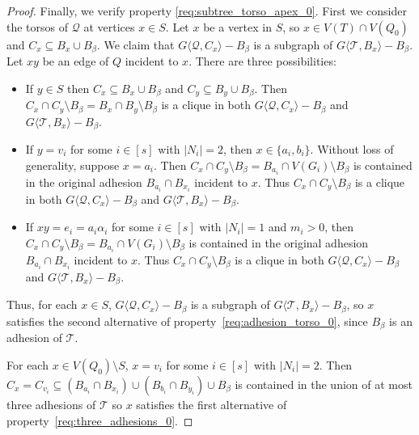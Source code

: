 \documentclass{patmorin}
\newcommand{\torso}[2]{{#1}\langle{#2}\rangle}
\newcommand{\calQ}{\mathcal{Q}}
\newcommand{\calT}{\mathcal{T}}
\begin{document}
\begin{proof}
  Finally, we verify property \ref{req:subtree_torso_apex_0}.  First we consider the torsos of $\calQ$ at vertices $x\in S$.  Let $x$ be a vertex in $S$, so $x\in V(T)\cap V(Q_0)$ and $C_x\subseteq B_x\cup B_\beta$.  We claim that $\torso{G}{\calQ,C_x}-B_\beta$ is a subgraph of $\torso{G}{\calT,B_x}-B_\beta$.  Let $xy$ be an edge of $Q$ incident to $x$. There are three possibilities:
  \begin{itemize}[nosep,nolistsep]
    \item If $y\in S$ then $C_x\subseteq B_x\cup B_\beta$ and $C_y\subseteq B_y\cup B_\beta$.  Then $C_x\cap C_y\setminus B_\beta=B_x\cap B_y\setminus B_\beta$ is a clique in both $\torso{G}{\calQ,C_x}-B_\beta$ and $\torso{G}{\calT,B_x}-B_\beta$.
    \item If $y=v_i$ for some $i\in[s]$ with $|N_i|=2$, then $x\in\{a_i,b_i\}$. Without loss of generality, suppose $x=a_i$.  Then $C_x\cap C_y\setminus B_\beta=B_{a_i}\cap V(G_i)\setminus B_\beta$ is contained in the original adhesion $B_{a_i}\cap B_{x_i}$ incident to $x$.  Thus $C_x\cap C_y\setminus B_\beta$ is a clique in both $\torso{G}{\calQ,C_x}-B_\beta$ and $\torso{G}{\calT,B_x}-B_\beta$.
    \item If $xy=e_i=a_i\alpha_i$ for some $i\in[s]$ with $|N_i|=1$ and $m_i>0$, then $C_x\cap C_y\setminus B_\beta = B_{a_i}\cap V(G_i)\setminus B_\beta$ is contained in the original adhesion $B_{a_i}\cap B_{x_i}$ incident to $x$.  Thus $C_x\cap C_y\setminus B_\beta$ is a clique in both $\torso{G}{\calQ,C_x}-B_\beta$ and $\torso{G}{\calT,B_x}-B_\beta$.
  \end{itemize}
  Thus, for each $x\in S$, $\torso{G}{\calQ,C_x}-B_\beta$ is a subgraph of $\torso{G}{\calT,B_x}-B_\beta$, so $x$ satisfies the second alternative of property~\ref{req:adhesion_torso_0}, since $B_\beta$ is an adhesion of $\calT$.

  For each $x\in V(Q_0)\setminus S$, $x=v_i$ for some $i\in[s]$ with $|N_i|=2$.  Then $C_x=C_{v_i}\subseteq (B_{a_i}\cap B_{x_i})\cup (B_{b_i}\cap B_{y_i})\cup B_\beta$ is contained in the union of at most three adhesions of $\calT$ so $x$ satisfies the first alternative of property~\ref{req:three_adhesions_0}.


\end{proof}
\end{document}
